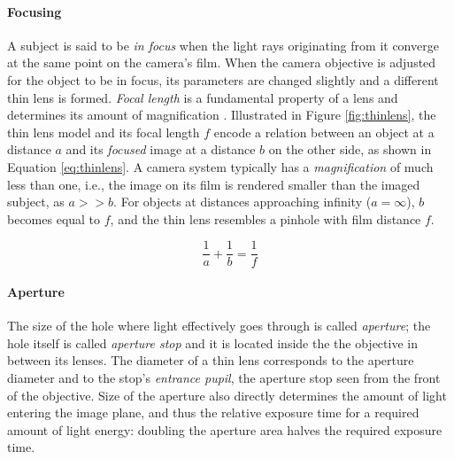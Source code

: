 \paragraph{Focusing}
A subject is said to be \emph{in focus} when the light rays originating from it converge at the same point on the camera's film.
When the camera objective is adjusted for the object to be in focus, its parameters are changed slightly and a different thin lens is formed.
\emph{Focal length} is a fundamental property of a lens and determines its amount of magnification \cite{szeliski10vision,greenleaf1950photographic}.
Illustrated in Figure \ref{fig:thinlens}, the thin lens model and its focal length $f$ encode a relation between an object at a distance $a$ and its \emph{focused} image at a distance $b$ on the other side, as shown in Equation \ref{eq:thinlens}.
A camera system typically has a \emph{magnification} of much less than one, i.e., the image on its film is rendered smaller than the imaged subject, as $a >> b$.
For objects at distances approaching infinity ($a = \infty$), $b$ becomes equal to $f$, and the thin lens resembles a pinhole with film distance $f$.

\begin{equation} \label{eq:thinlens}
	\frac{1}{a} + \frac{1}{b} = \frac{1}{f}
\end{equation}





\paragraph{Aperture}
The size of the hole where light effectively goes through is called \emph{aperture}; the hole itself is called \emph{aperture stop} and it is located inside the the objective in between its lenses.
The diameter of a thin lens corresponds to the aperture diameter and to the stop's \emph{entrance pupil}, the aperture stop seen from the front of the objective.
Size of the aperture also directly determines the amount of light entering the image plane, and thus the relative exposure time for a required amount of light energy: doubling the aperture area halves the required exposure time.
\cite{greenleaf1950photographic}

